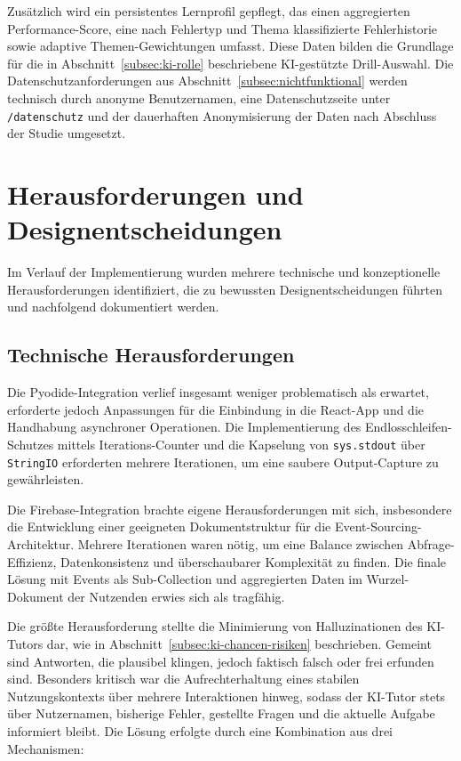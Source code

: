 Zusätzlich wird ein persistentes Lernprofil gepflegt, das einen aggregierten Performance-Score, eine nach Fehlertyp und Thema klassifizierte Fehlerhistorie sowie adaptive Themen-Gewichtun\-gen umfasst.
Diese Daten bilden die Grundlage für die in Abschnitt~\ref{subsec:ki-rolle} beschriebene KI-gestützte Drill-Auswahl.
Die Datenschutzanforderungen aus Abschnitt~\ref{subsec:nichtfunktional} werden technisch durch anonyme Benutzernamen, eine Datenschutzseite unter \texttt{/datenschutz} und der dauerhaften Anonymisierung der Daten nach Abschluss der Studie umgesetzt.


\section{Herausforderungen und Designentscheidungen}\label{sec:herausforderungen}

Im Verlauf der Implementierung wurden mehrere technische und konzeptionelle Herausforderungen identifiziert, die zu bewussten Designentscheidungen führten und nachfolgend dokumentiert werden.

\subsection{Technische Herausforderungen}

Die Pyodide-Integration verlief insgesamt weniger problematisch als erwartet, erforderte jedoch Anpassungen für die Einbindung in die React-App und die Handhabung asynchroner Operationen.
Die Implementierung des Endlosschleifen-Schutzes mittels Iterations-Counter und die Kapselung von \texttt{sys.stdout} über \texttt{StringIO} erforderten mehrere Iterationen, um eine saubere Output-Capture zu gewährleisten.

Die Firebase-Integration brachte eigene Herausforderungen mit sich, insbesondere die Entwicklung einer geeigneten Dokumentstruktur für die Event-Sourcing-Architektur.
Mehrere Iterationen waren nötig, um eine Balance zwischen Abfrage-Effizienz, Datenkonsistenz und überschaubarer Komplexität zu finden.
Die finale Lösung mit Events als Sub-Collection und aggregierten Daten im Wurzel-Dokument der Nutzenden erwies sich als tragfähig.

Die größte Herausforderung stellte die Minimierung von Halluzinationen des KI-Tutors dar, wie in Abschnitt~\ref{subsec:ki-chancen-risiken} beschrieben. Gemeint sind Antworten, die plausibel klingen, jedoch faktisch falsch oder frei erfunden sind.
Besonders kritisch war die Aufrechterhaltung eines stabilen Nutzungskontexts über mehrere Interaktionen hinweg, sodass der KI-Tutor stets über Nutzernamen, bisherige Fehler, gestellte Fragen und die aktuelle Aufgabe informiert bleibt.
Die Lösung erfolgte durch eine Kombination aus drei Mechanismen: 

